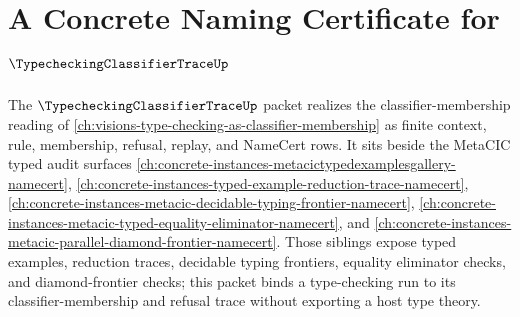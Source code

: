\chapter{A Concrete Naming Certificate for $\TypecheckingClassifierTraceUp$}
\label{ch:concrete-instances-typechecking-classifier-trace-namecert}

The $\TypecheckingClassifierTraceUp$ packet realizes the classifier-membership reading of \autoref{ch:visions-type-checking-as-classifier-membership} as finite context, rule, membership, refusal, replay, and NameCert rows. It sits beside the MetaCIC typed audit surfaces \autoref{ch:concrete-instances-metacictypedexamplesgallery-namecert}, \autoref{ch:concrete-instances-typed-example-reduction-trace-namecert}, \autoref{ch:concrete-instances-metacic-decidable-typing-frontier-namecert}, \autoref{ch:concrete-instances-metacic-typed-equality-eliminator-namecert}, and \autoref{ch:concrete-instances-metacic-parallel-diamond-frontier-namecert}. Those siblings expose typed examples, reduction traces, decidable typing frontiers, equality eliminator checks, and diamond-frontier checks; this packet binds a type-checking run to its classifier-membership and refusal trace without exporting a host type theory.

